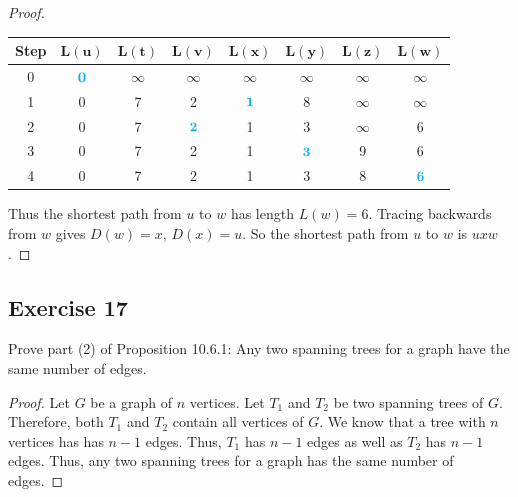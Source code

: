 \documentclass[14pt]{extarticle}
\newcommand{\cy}{\color{cyan}}
\begin{document}
\begin{proof}
\begin{center}
        \begin{tabular}{|c|c|c|c|c|c|c|c|}
            \hline
            {\bf \cy Step} & {\cy \(\bm{L(u)}\)} & {\cy\(\bm{L(t)}\)} & {\cy\(\bm{L(v)}\)} & {\cy\(\bm{L(x)}\)} & {\cy\(\bm{L(y)}\)} & {\cy\(\bm{L(z)}\)} & {\cy\(\bm{L(w)}\)} \\
            \hline
            0              & \({\cy \bm{0}}\)    & \(\infty\)         & \(\infty\)         & \(\infty\)         & \(\infty\)         & \(\infty\)         & \(\infty\)         \\
            1              & 0                   & 7                  & 2                  & \({\cy \bm{1}}\)   & 8                  & \(\infty\)         & \(\infty\)         \\
            2              & 0                   & 7                  & \({\cy \bm{2}}\)   & 1                  & 3                  & \(\infty\)         & 6                  \\
            3              & 0                   & 7                  & 2                  & 1                  & \({\cy \bm{3}}\)   & 9                  & 6                  \\
            4              & 0                   & 7                  & 2                  & 1                  & 3                  & 8                  & \({\cy \bm{6}}\)   \\
            \hline
        \end{tabular}
    \end{center}

    Thus the shortest path from \(u\) to \(w\) has length \(L(w) = 6\). Tracing backwards from \(w\) gives \(D(w) = x\),
    \(D(x) = u\). So the shortest path from \(u\) to \(w\) is \(uxw\).
\end{proof}

\subsection{Exercise 17}
Prove part (2) of Proposition 10.6.1: Any two spanning trees for a graph have the same number of edges.

\begin{proof}
    Let \(G\) be a graph of \(n\) vertices. Let \(T_1\) and \(T_2\) be two spanning trees of \(G\). Therefore, both \(T_1\)
    and \(T_2\) contain all vertices of \(G\). We know that a tree with \(n\) vertices has has \(n-1\) edges. Thus, \(T_1\) has
    \(n-1\) edges as well as \(T_2\) has \(n-1\) edges. Thus, any two spanning trees for a graph has the same number of edges.
\end{proof}
\end{document}
